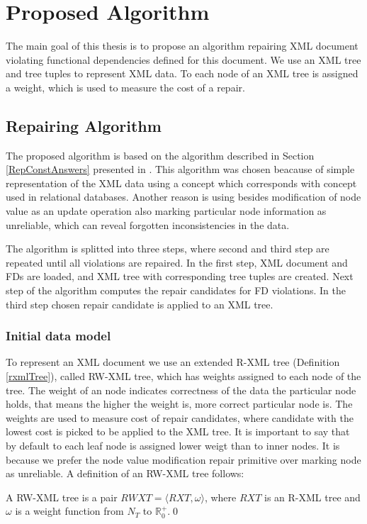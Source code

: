 \chapter{Proposed Algorithm}

The main goal of this thesis is to propose an algorithm repairing XML document violating functional dependencies defined for this document. We use an XML tree and tree tuples to represent XML data. To each node of an XML tree is assigned a weight, which is used to measure the cost of a repair.


\section{Repairing Algorithm}

The proposed algorithm is based on the algorithm described in Section \ref{RepConstAnswers} presented in \cite{RepAndConsistentAnswer}. This algorithm was chosen beacause of simple representation of the XML data using a concept which corresponds with concept used in relational databases. Another reason is using besides modification of node value as an update operation also marking particular node information as unreliable, which can reveal forgotten inconsistencies in the data.

The algorithm is splitted into three steps, where second and third step are repeated until all violations are repaired. In the first step, XML document and FDs are loaded, and XML tree with corresponding tree tuples are created. Next step of the algorithm computes the repair candidates for FD violations. In the third step chosen repair candidate is applied to an XML tree.

\subsection{Initial data model}

To represent an XML document we use an extended R-XML tree (Definition \ref{rxmlTree}), called RW-XML tree, which has weights assigned to each node of the tree. The weight of an node indicates correctness of the data the particular node holds, that means the higher the weight is, more correct particular node is. The weights are used to measure cost of repair candidates, where candidate with the lowest cost is picked to be applied to the XML tree. It is important to say that by default to each leaf node is assigned lower weigt than to inner nodes. It is because we prefer the node value modification repair primitive over marking node as unreliable. A definition of an RW-XML tree follows:

\begin{define}
A RW-XML tree is a pair $RWXT = \langle RXT, \omega \rangle$, where $RXT$ is an R-XML tree and $\omega$ is a weight function from $N_T$ to $\mathbb{R}^+_0$.\qed
\end{define}

